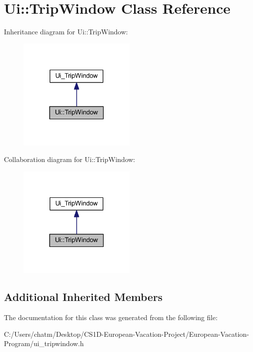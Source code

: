 \hypertarget{class_ui_1_1_trip_window}{}\section{Ui\+::Trip\+Window Class Reference}
\label{class_ui_1_1_trip_window}


Inheritance diagram for Ui\+::Trip\+Window\+:
\nopagebreak
\begin{figure}[H]
\begin{center}
\leavevmode
\includegraphics[width=162pt]{class_ui_1_1_trip_window__inherit__graph}
\end{center}
\end{figure}


Collaboration diagram for Ui\+::Trip\+Window\+:
\nopagebreak
\begin{figure}[H]
\begin{center}
\leavevmode
\includegraphics[width=162pt]{class_ui_1_1_trip_window__coll__graph}
\end{center}
\end{figure}
\subsection*{Additional Inherited Members}


The documentation for this class was generated from the following file\+:\begin{DoxyCompactItemize}
\item 
C\+:/\+Users/chatm/\+Desktop/\+C\+S1\+D-\/\+European-\/\+Vacation-\/\+Project/\+European-\/\+Vacation-\/\+Program/ui\+\_\+tripwindow.\+h\end{DoxyCompactItemize}
